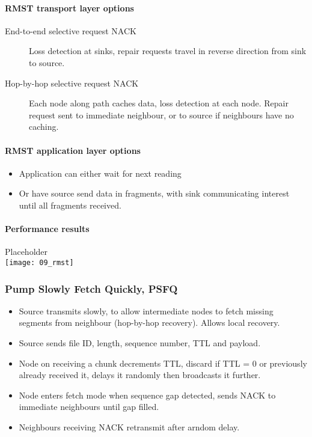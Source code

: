\paragraph{RMST transport layer options}

\begin{description}
		\item[End-to-end selective request NACK] Loss detection at sinks,
				repair requests travel in reverse direction from sink to
				source.
		\item[Hop-by-hop selective request NACK] Each node along path caches
				data, loss detection at each node. Repair request sent to
				immediate neighbour, or to source if neighbours have no
				caching.
\end{description}

\paragraph{RMST application layer options}

\begin{itemize}
		\item Application can either wait for next reading
		\item Or have source send data in fragments, with sink communicating
				interest until all fragments received.
\end{itemize}

\paragraph{Performance results}
Placeholder
\\
\texttt{[image: 09\_rmst]}

\subsubsection{Pump Slowly Fetch Quickly, PSFQ}

\begin{itemize}
		\item Source transmits slowly, to allow intermediate nodes to fetch
				missing segments from neighbour (hop-by-hop recovery). Allows
				local recovery.
		\item Source sends file ID, length, sequence number, TTL and payload.
		\item Node on receiving a chunk decrements TTL, discard if TTL = 0 or
				previously already received it, delays it randomly then
				broadcasts it further.
		\item Node enters fetch mode when sequence gap detected, sends NACK to
				immediate neighbours until gap filled.
		\item Neighbours receiving NACK retransmit after arndom delay.
\end{itemize}

